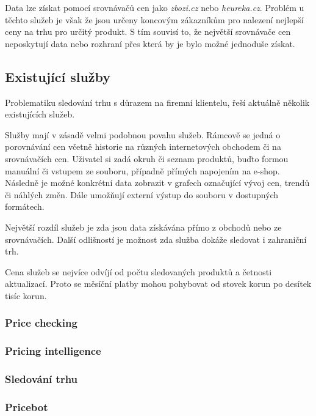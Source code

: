 \documentclass[thesis=B,czech]{FITthesis}[2012/06/26]
\begin{document}
Data lze získat pomocí srovnávačů cen jako \textit{zbozi.cz}\cite{heureka} 
nebo \textit{heureka.cz}\cite{zbozi}. Problém u těchto služeb je však že jsou určeny koncovým zákazníkům 
pro nalezení nejlepší ceny na trhu pro určitý produkt. S tím souvisí to, že největší srovnávače cen neposkytují data nebo
rozhraní přes která by je bylo možné jednoduše získat.

\subsection{Existující služby}

Problematiku sledování trhu s důrazem na firemní klientelu, řeší aktuálně několik existujících služeb.
\par
Služby mají v zásadě velmi podobnou povahu služeb. Rámcově se jedná o porovnávání cen včetně historie na různých internetových
obchodem či na srovnávačích cen. Uživatel si zadá okruh či seznam produktů, buďto formou manuální či vstupem ze souboru, případně 
přímých napojením na e-shop. Následně je možné konkrétní data zobrazit v grafech označující vývoj cen, trendů či náhlých změn.
Dále umožňují externí výstup do souboru v dostupných formátech.
\par
Největší rozdíl služeb je zda jsou data získávána přímo z obchodů nebo ze srovnávačích. Další odlišností je 
možnost zda služba dokáže sledovat i zahraniční trh.
\par
Cena služeb se nejvíce odvíjí od počtu sledovaných produktů a četnosti aktualizací. Proto se měsíční platby mohou 
pohybovat od stovek korun po desítek tisíc korun.

\subsubsection{Price checking}

\subsubsection{Pricing intelligence}

\subsubsection{Sledování trhu}

\subsubsection{Pricebot}
\end{document}
